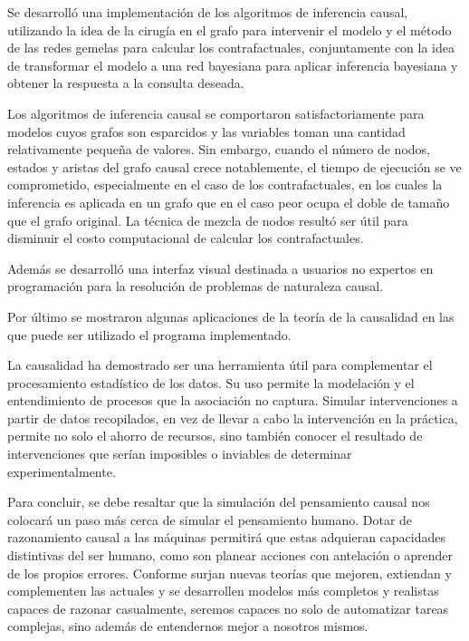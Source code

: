 \begin{conclusions}
	Se desarrolló una implementación de los algoritmos de inferencia causal, utilizando la idea de la cirugía en el grafo para intervenir el modelo y el método de las redes gemelas para calcular los contrafactuales, conjuntamente con la idea de transformar el modelo a una red bayesiana para aplicar inferencia bayesiana y obtener la respuesta a la consulta deseada.
	
	Los algoritmos de inferencia causal se comportaron satisfactoriamente para modelos cuyos grafos son esparcidos y las variables toman una cantidad relativamente pequeña de valores. Sin embargo, cuando el número de nodos, estados y aristas del grafo causal crece notablemente, el tiempo de ejecución se ve comprometido, especialmente en el caso de los contrafactuales, en los cuales la inferencia es aplicada en un grafo que en el caso peor ocupa el doble de tamaño que el grafo original. La técnica de mezcla de nodos resultó ser útil para disminuir el costo computacional de calcular los contrafactuales.
	
	Además se desarrolló una interfaz visual destinada a usuarios no expertos en programación para la resolución de problemas de naturaleza causal.
	
	Por último se mostraron algunas aplicaciones de la teoría de la causalidad en las que puede ser utilizado el programa implementado.
	
	La causalidad ha demostrado ser una herramienta útil para complementar el procesamiento estadístico de los datos. Su uso permite la modelación y el entendimiento de procesos que la asociación no captura. Simular intervenciones a partir de datos recopilados, en vez de llevar a cabo la intervención en la práctica, permite no solo el ahorro de recursos, sino también conocer el resultado de intervenciones que serían imposibles o inviables de determinar experimentalmente.
	
	Para concluir, se debe resaltar que la simulación del pensamiento causal nos colocará un paso más cerca de simular el pensamiento humano. Dotar de razonamiento causal a las máquinas permitirá que estas adquieran capacidades distintivas del ser humano, como son planear acciones con antelación o aprender de los propios errores. Conforme surjan nuevas teorías que mejoren, extiendan y complementen las actuales y se desarrollen modelos más completos y realistas capaces de razonar casualmente, seremos capaces no solo de automatizar tareas complejas, sino además de entendernos mejor a nosotros mismos.	
\end{conclusions}